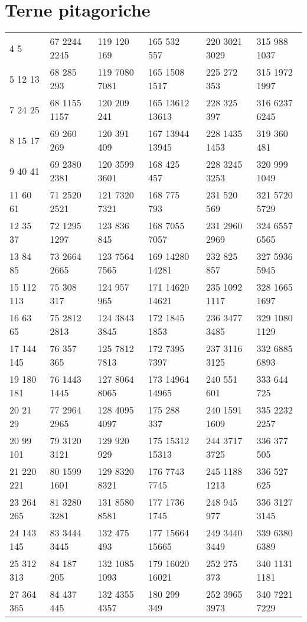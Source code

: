 \section{Terne pitagoriche}
\begin{center}
\footnotesize
\begin{longtable}[c]{llllll}
	\toprule\endhead
\bottomrule \endfoot
3 4 5&67 2244 2245&119 120 169&165 532 557&220 3021 3029&315 988 1037\\
5 12 13&68 285 293&119 7080 7081&165 1508 1517&225 272 353&315 1972 1997\\
7 24 25&68 1155 1157&120 209 241&165 13612 13613&228 325 397&316 6237 6245\\
8 15 17&69 260 269&120 391 409&167 13944 13945&228 1435 1453&319 360 481\\
9 40 41&69 2380 2381&120 3599 3601&168 425 457&228 3245 3253&320 999 1049\\
11 60 61&71 2520 2521&121 7320 7321&168 775 793&231 520 569&321 5720 5729\\
12 35 37&72 1295 1297&123 836 845&168 7055 7057&231 2960 2969&324 6557 6565\\
13 84 85&73 2664 2665&123 7564 7565&169 14280 14281&232 825 857&327 5936 5945\\
15 112 113&75 308 317&124 957 965&171 14620 14621&235 1092 1117&328 1665 1697\\
16 63 65&75 2812 2813&124 3843 3845&172 1845 1853&236 3477 3485&329 1080 1129\\
17 144 145&76 357 365&125 7812 7813&172 7395 7397&237 3116 3125&332 6885 6893\\
19 180 181&76 1443 1445&127 8064 8065&173 14964 14965&240 551 601&333 644 725\\
20 21 29&77 2964 2965&128 4095 4097&175 288 337&240 1591 1609&335 2232 2257\\
20 99 101&79 3120 3121&129 920 929&175 15312 15313&244 3717 3725&336 377 505\\
21 220 221&80 1599 1601&129 8320 8321&176 7743 7745&245 1188 1213&336 527 625\\
23 264 265&81 3280 3281&131 8580 8581&177 1736 1745&248 945 977&336 3127 3145\\
24 143 145&83 3444 3445&132 475 493&177 15664 15665&249 3440 3449&339 6380 6389\\
25 312 313&84 187 205&132 1085 1093&179 16020 16021&252 275 373&340 1131 1181\\
27 364 365&84 437 445&132 4355 4357&180 299 349&252 3965 3973&340 7221 7229\\

\end{longtable}
\end{center}

